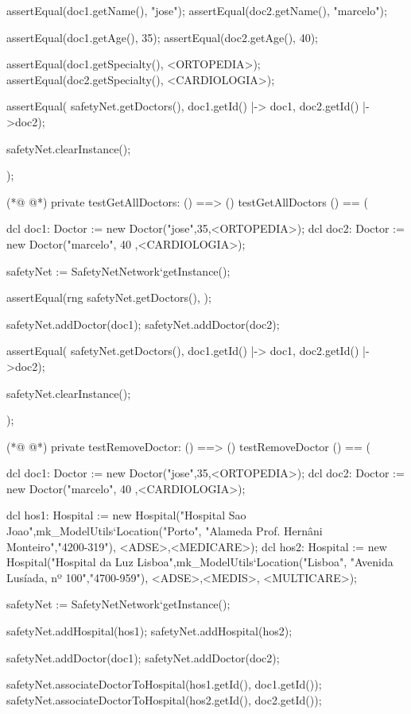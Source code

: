 \begin{vdmpp}[breaklines=true]
  assertEqual(doc1.getName(), "jose");
  assertEqual(doc2.getName(), "marcelo");
  
  assertEqual(doc1.getAge(), 35);
  assertEqual(doc2.getAge(), 40); 
  
  assertEqual(doc1.getSpecialty(), <ORTOPEDIA>);
  assertEqual(doc2.getSpecialty(), <CARDIOLOGIA>);
  
  assertEqual( safetyNet.getDoctors(), {doc1.getId() |-> doc1, doc2.getId() |->doc2});
  
  safetyNet.clearInstance();
    
);

(*@
\label{testGetAllDoctors:163}
@*)
private testGetAllDoctors: () ==> ()
 testGetAllDoctors () == (
  
  dcl doc1: Doctor := new Doctor("jose",35,<ORTOPEDIA>);
  dcl doc2: Doctor := new Doctor("marcelo", 40 ,<CARDIOLOGIA>);
  
  safetyNet := SafetyNetNetwork`getInstance();

  assertEqual(rng safetyNet.getDoctors(), {});
   
  safetyNet.addDoctor(doc1);
  safetyNet.addDoctor(doc2);

  assertEqual( safetyNet.getDoctors(), {doc1.getId() |-> doc1, doc2.getId() |->doc2});
  
  safetyNet.clearInstance();
    
);

(*@
\label{testRemoveDoctor:182}
@*)
private testRemoveDoctor: () ==> ()
 testRemoveDoctor () == (
  
  dcl doc1: Doctor := new Doctor("jose",35,<ORTOPEDIA>);
  dcl doc2: Doctor := new Doctor("marcelo", 40 ,<CARDIOLOGIA>);
  
  dcl hos1: Hospital := new Hospital("Hospital Sao Joao",mk_ModelUtils`Location("Porto", "Alameda Prof. Hernâni Monteiro","4200-319"), {<ADSE>,<MEDICARE>});
  dcl hos2: Hospital := new Hospital("Hospital da Luz Lisboa",mk_ModelUtils`Location("Lisboa", "Avenida Lusíada, nº 100","4700-959"), {<ADSE>,<MEDIS>, <MULTICARE>});
  
  safetyNet := SafetyNetNetwork`getInstance();
   
  safetyNet.addHospital(hos1);
  safetyNet.addHospital(hos2);
   
  safetyNet.addDoctor(doc1);
  safetyNet.addDoctor(doc2);
  
  safetyNet.associateDoctorToHospital(hos1.getId(), doc1.getId());
  safetyNet.associateDoctorToHospital(hos2.getId(), doc2.getId());
  

\end{vdmpp}
